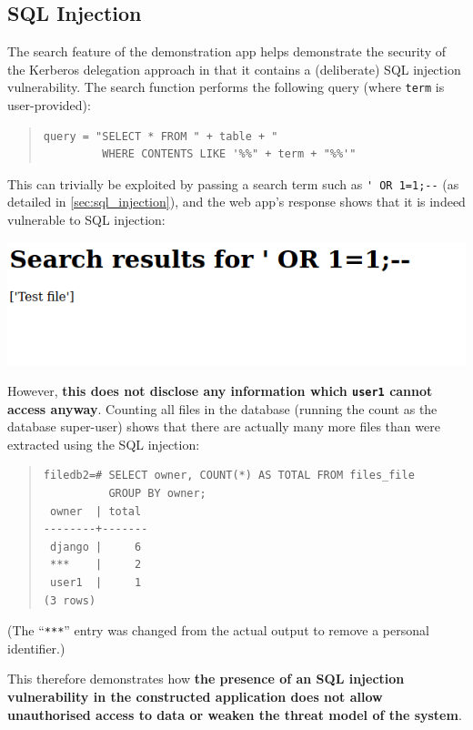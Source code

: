 \documentclass[12pt]{report}
\begin{document}
\subsection{SQL Injection}
The search feature of the demonstration app helps demonstrate the security of the Kerberos delegation approach in that it contains a (deliberate) SQL injection vulnerability. The search function performs the following query (where \texttt{term} is user-provided):

\begin{quote}
\begin{verbatim}
query = "SELECT * FROM " + table + "
         WHERE CONTENTS LIKE '%%" + term + "%%'"
\end{verbatim}
\end{quote}

This can trivially be exploited by passing a search term such as \verb+' OR 1=1;--+ (as detailed in \autoref{sec:sql_injection}), and the web app's response shows that it is indeed vulnerable to SQL injection:

\begin{center}
  \includegraphics[scale=0.5]{08-browser4-sql.png}
\end{center}

However, \textbf{this does not disclose any information which \texttt{user1} cannot access anyway}. Counting all files in the database (running the count as the database super-user) shows that there are actually many more files than were extracted using the SQL injection:

\begin{quote}
\begin{verbatim}
filedb2=# SELECT owner, COUNT(*) AS TOTAL FROM files_file
          GROUP BY owner;
 owner  | total
--------+-------
 django |     6
 ***    |     2
 user1  |     1
(3 rows)
\end{verbatim}
\end{quote}

(The ``\verb+***+'' entry was changed from the actual output to remove a personal identifier.)

This therefore demonstrates how \textbf{the presence of an SQL injection vulnerability in the constructed application does not allow unauthorised access to data or weaken the threat model of the system}.
\end{document}
